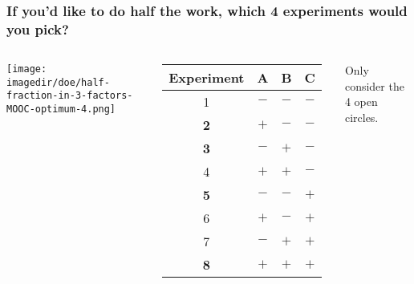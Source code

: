 \documentclass[handout,11pt,aspectratio=169,mathserif]{beamer}
\begin{document}
\begin{frame}\frametitle{If you'd like to do half the work, which 4 experiments would you pick?}
	\begin{columns}
			\begin{center}
				\texttt{[image: \\imagedir/doe/half-fraction-in-3-factors-MOOC-optimum-4.png]}
			\end{center}
			
			\begin{tabulary}{\linewidth}{|c||c|c|c|}\hline 
				\textsf{\relax Experiment } & \textbf{\relax A } & \textbf{\relax B } & \textbf{\relax C } \\
				\hline \color{lightgray} 1 & \color{lightgray} \(-\) & \color{lightgray}\(-\) & \color{lightgray}\(-\) \\
				\hline \color{myOrange} \textbf{2} & \(+\) & \(-\) & \(-\) \\
				\hline \color{myOrange} \textbf{3} & \(-\) & \(+\) & \(-\) \\
				\hline \color{lightgray}4 & \color{lightgray}\(+\) & \color{lightgray}\(+\) & \color{lightgray}\(-\) \\
				\hline \color{myOrange} \textbf{5} & \(-\) & \(-\) & \(+\) \\
				\hline \color{lightgray}6 & \color{lightgray}\(+\) & \color{lightgray}\(-\) & \color{lightgray}\(+\) \\
				\hline \color{lightgray}7 & \color{lightgray}\(-\) & \color{lightgray}\(+\) & \color{lightgray}\(+\) \\
				\hline \color{myOrange} \textbf{8} & \(+\) & \(+\) & \(+\) \\
				\hline
			\end{tabulary}
			
			\vspace{1cm}
			{\color{myOrange} Only consider the 4 open circles.}
	\end{columns}	

\end{frame}
\end{document}
